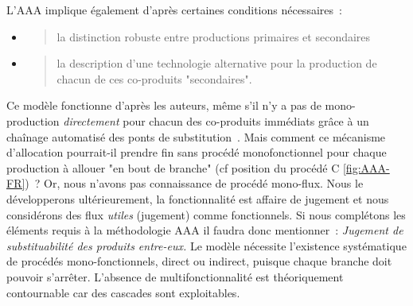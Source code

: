 L'AAA implique également d'après \citeauthor{majeau-bettez_unified_2014} certaines conditions nécessaires~:
\begin{itemize}
\item \blockcquote[traduction]{majeau-bettez_unified_2014}{la distinction robuste entre productions primaires et secondaires}
\item \blockcquote[traduction]{majeau-bettez_unified_2014}{la description d'une technologie alternative pour la production de chacun de ces co-produits "secondaires".}
\end{itemize}
Ce modèle fonctionne d'après les auteurs, même s'il n'y a pas de mono-production \textit{directement} pour chacun des co-produits immédiats grâce à un chaînage automatisé des ponts de substitution~\cite{majeau-bettez_unified_2014}.
Mais comment ce mécanisme d'allocation pourrait-il prendre fin sans procédé monofonctionnel pour chaque production à allouer "en bout de branche" (cf position du procédé C \ref{fig:AAA-FR})~?
Or, nous n'avons pas connaissance de procédé mono-flux.
Nous le développerons ultérieurement, la fonctionnalité est affaire de jugement et nous considérons des flux \emph{utiles} (jugement) comme fonctionnels.
Si nous complétons les éléments requis à la méthodologie AAA il faudra donc mentionner~: \emph{Jugement de substituabilité des produits entre-eux.}
Le modèle nécessite l'existence systématique de procédés mono-fonctionnels, direct ou indirect, puisque chaque branche doit pouvoir s'arrêter.
L'absence de multifonctionnalité est théoriquement contournable car des cascades sont exploitables. 
